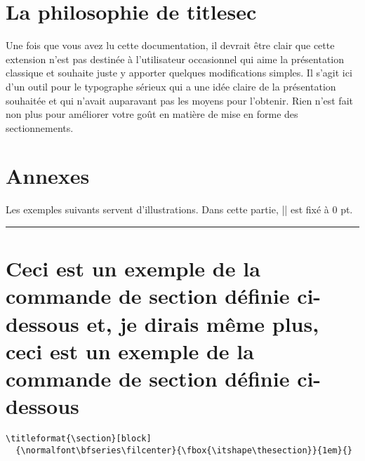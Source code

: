 \documentclass[a4paper]{ltxguide}
\newcommand{\examplesep}{%
  \begin{center}%
    \rule{4pt}{4pt}%
  \end{center}}
\begin{document}
\section{La philosophie de \textsf{titlesec}}

Une fois que vous avez lu cette documentation, il devrait être clair que cette
extension n'est pas destinée à l'utilisateur occasionnel qui aime la présentation
classique et souhaite juste y apporter quelques modifications simples. Il s'agit ici
d'un outil pour le typographe sérieux qui a une idée claire de la présentation 
souhaitée et qui n'avait auparavant pas les moyens pour l'obtenir. Rien n'est fait non
plus pour améliorer votre goût en matière de mise en forme des sectionnements.


\section{Annexes}

Les exemples suivants servent d'illustrations. Dans cette partie, |\parskip| est
fixé à 0 pt.

\begingroup

\setlength{\parskip}{0pt}

\examplesep

\titleformat{\section}[block]
  {\normalfont\bfseries\filcenter}{\fbox{\itshape\thesection}}{1em}{}

\section[Annexes]{Ceci est un exemple de la commande de section définie ci-dessous 
et, je dirais même plus, ceci est un exemple de la commande de section définie 
ci-dessous}

\begin{verbatim}
\titleformat{\section}[block]
  {\normalfont\bfseries\filcenter}{\fbox{\itshape\thesection}}{1em}{}
\end{verbatim}
\end{document}
